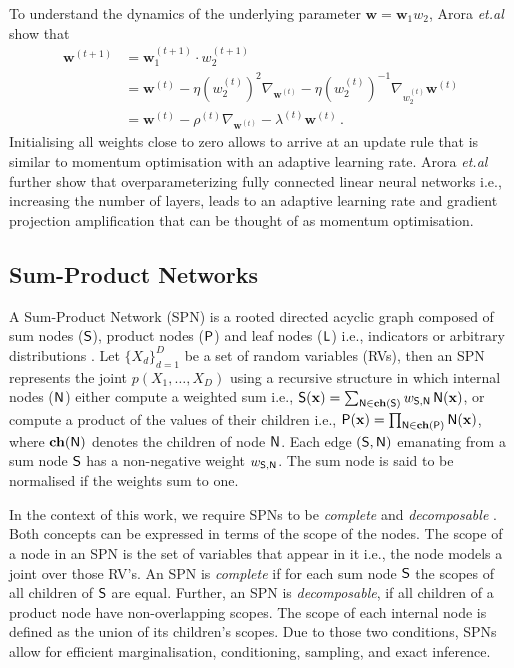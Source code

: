 \documentclass{article}
\begin{document}
To understand the dynamics of the underlying parameter $\bm w = \bm w_1 w_2$, Arora {\it et.al} \cite{Arora2018} show that
\begin{align*}
  \bm w^{(t+1)} &= \bm w_1^{(t+1)} \cdot w_2^{(t+1)} \\
   &= \bm w^{(t)} - \eta (w^{(t)}_2)^2 \nabla_{\bm w^{(t)}} - \eta (w^{(t)}_2)^{-1} \nabla_{w^{(t)}_2} \bm w^{(t)} \\
   &= \bm w^{(t)} - \rho^{(t)} \nabla_{\bm w^{(t)}} - \lambda^{(t)} \bm w^{(t)} \, .
\end{align*}
Initialising all weights close to zero allows to arrive at an update rule that is similar to momentum optimisation \cite{Nesterov1983} with an adaptive learning rate.
Arora {\it et.al} further show that overparameterizing fully connected linear neural networks i.e., increasing the number of layers, leads to an adaptive learning rate and gradient projection amplification that can be thought of as momentum optimisation.

\subsection{Sum-Product Networks}
A Sum-Product Network (SPN) \cite{Poon2011a} is a rooted directed acyclic graph composed of sum nodes ($\mathsf{S}$), product nodes ($\mathsf{P}$) and leaf nodes ($\mathsf{L}$) i.e.,  indicators or arbitrary distributions \cite{Peharz2015}.
Let $\{X_{d}\}_{d=1}^D$ be a set of random variables (RVs), then an SPN represents the joint $p(X_1, \dots, X_D)$ using a recursive structure in which internal nodes ($\mathsf{N}$) either compute a weighted sum i.e., $\mathsf{S}(\mathbf{x}) = \sum_{\mathsf{N} \in \mathbf{ch}(\mathsf{S})} w_{\mathsf{S},\mathsf{N}} \, \mathsf{N}(\mathbf{x})$, 
or compute a product of the values of their children i.e., $\mathsf{P}(\mathbf{x}) = \prod_{\mathsf{N} \in \mathbf{ch}(\mathsf{P})} \mathsf{N}(\mathbf{x})$,
where $\mathbf{ch}(\mathsf{N})$ denotes the children of node $\mathsf{N}$.
Each edge $(\mathsf{S},\mathsf{N})$ emanating from a sum node $\mathsf{S}$ has a non-negative weight $w_{\mathsf{S},\mathsf{N}}$. The sum node is said to be normalised if the weights sum to one.

In the context of this work, we require SPNs to be \emph{complete} and \emph{decomposable} \cite{Poon2011a,Darwiche2003}.
Both concepts can be expressed in terms of the scope of the nodes.
The scope of a node in an SPN is the set of variables that appear in it i.e., the node models a joint over those RV's.
An SPN is \emph{complete} if for each sum node $\mathsf{S}$ the scopes of all children of $\mathsf{S}$ are equal.
Further, an SPN is \emph{decomposable}, if all children of a product node have non-overlapping scopes.
The scope of each internal node is defined as the union of its children's scopes.
Due to those two conditions, SPNs allow for efficient marginalisation, conditioning, sampling, and exact inference.
\end{document}
